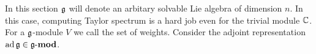 In this section $\mathfrak{g}$ will denote an arbitary solvable Lie algebra of dimension $n$. In this
case, computing Taylor spectrum is a hard job even for the trivial module $\mathbb{C}$. For a
$\mathfrak{g}$-module $V$ we call the set of weights. Consider the
adjoint representation $\operatorname{ad}\mathfrak{g} \in \operatorname{\mathbf{\mathfrak{g}-mod}}$.
